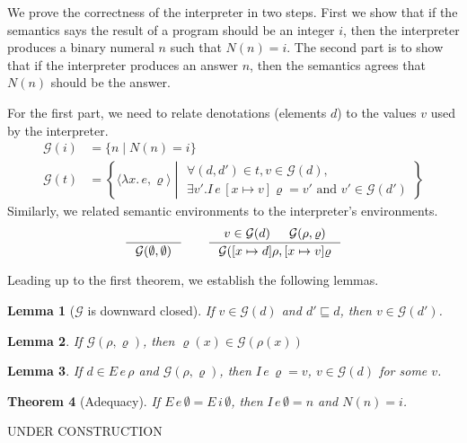 \documentclass{tufte-handout}
\newcommand{\LAM}[1]{\lambda #1.\,}
\newtheorem{theorem}{Theorem}%
\newtheorem{lemma}[theorem]{Lemma}
\begin{document}
We prove the correctness of the interpreter in two steps.  First we
show that if the semantics says the result of a program should be an
integer $i$, then the interpreter produces a binary numeral $n$ such
that $N(n) = i$. The second part is to show that if the interpreter
produces an answer $n$, then the semantics agrees that $N(n)$ should
be the answer.

For the first part, we need to relate denotations (elements $d$) to
the values $v$ used by the interpreter.
\begin{align*}
  \mathcal{G}(i) &= \{ n \mid N(n) = i \} \\
  \mathcal{G}(t) &= \left\{ \langle \LAM{x} e, \varrho \rangle \middle|
     \begin{array}{l}
       \forall (d,d') \in t, v \in \mathcal{G}(d),\\
       \exists v'. I\,e\,[x\mapsto v]\varrho = v'
               \text{ and } v'\in\mathcal{G}(d')
     \end{array} \right\}
\end{align*}
Similarly, we related semantic environments to the
interpreter's environments.
\[
  \inference{}{\mathcal{G}(\emptyset,\emptyset)}
  \qquad
  \inference{v \in \mathcal{G}(d) & \mathcal{G}(\rho,\varrho)}
            {\mathcal{G}([x\mapsto d] \rho, [x\mapsto v] \varrho}
\]

\noindent Leading up to the first theorem, we establish the following lemmas.

\begin{lemma}[$\mathcal{G}$ is downward closed]
\label{lem:sub-good}
If $v \in \mathcal{G}(d)$ and $d' \sqsubseteq d$, then $v \in \mathcal{G}(d')$.
\end{lemma}

\begin{lemma}
\label{lem:lookup-good}
  If $\mathcal{G}(\rho,\varrho)$,
  then $\varrho(x) \in \mathcal{G}(\rho(x))$
\end{lemma}

\begin{lemma}
  If $d \in E\,e\,\rho$ and $\mathcal{G}(\rho,\varrho)$, then
  $I\,e\,\varrho = v$, $v \in \mathcal{G}(d)$ for some $v$.
\end{lemma}

\begin{theorem}[Adequacy]
If $E\,e\,\emptyset = E\,i\,\emptyset$, then $I\,e\,\emptyset = n$
and $N(n) = i$.
\end{theorem}

UNDER CONSTRUCTION
\end{document}

